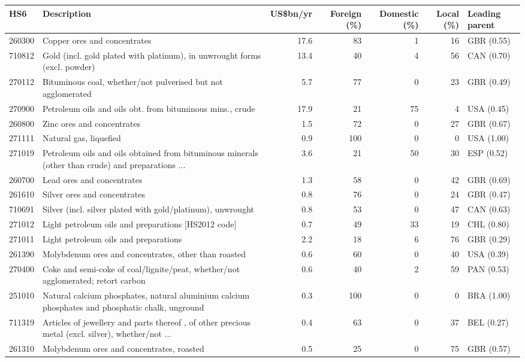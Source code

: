 \begin{tabular}{@{}l p{6.4cm} r r r r l@{}}
\toprule
HS6 & Description & US\$bn/yr & Foreign (\%) & Domestic (\%) & Local (\%) & Leading parent \\
\midrule
260300 & Copper ores and concentrates & 17.6 & 83 & 1 & 16 & GBR (0.55) \\
710812 & Gold (incl. gold plated with platinum), in unwrought forms (excl. powder) & 13.4 & 40 & 4 & 56 & CAN (0.70) \\
270112 & Bituminous coal, whether/\allowbreak{}not pulverised but not agglomerated & 5.7 & 77 & 0 & 23 & GBR (0.49) \\
270900 & Petroleum oils and oils obt. from bituminous mins., crude & 17.9 & 21 & 75 & 4 & USA (0.45) \\
260800 & Zinc ores and concentrates & 1.5 & 72 & 0 & 27 & GBR (0.67) \\
271111 & Natural gas, liquefied & 0.9 & 100 & 0 & 0 & USA (1.00) \\
271019 & Petroleum oils and oils obtained from bituminous minerals (other than crude) and preparations ... & 3.6 & 21 & 50 & 30 & ESP (0.52) \\
260700 & Lead ores and concentrates & 1.3 & 58 & 0 & 42 & GBR (0.69) \\
261610 & Silver ores and concentrates & 0.8 & 76 & 0 & 24 & GBR (0.47) \\
710691 & Silver (incl. silver plated with gold/\allowbreak{}platinum), unwrought & 0.8 & 53 & 0 & 47 & CAN (0.63) \\
271012 & Light petroleum oils and preparations [HS2012 code] & 0.7 & 49 & 33 & 19 & CHL (0.80) \\
271011 & Light petroleum oils and preparations & 2.2 & 18 & 6 & 76 & GBR (0.29) \\
261390 & Molybdenum ores and concentrates, other than roasted & 0.6 & 60 & 0 & 40 & USA (0.39) \\
270400 & Coke and semi-coke of coal/\allowbreak{}lignite/\allowbreak{}peat, whether/\allowbreak{}not agglomerated; retort carbon & 0.6 & 40 & 2 & 59 & PAN (0.53) \\
251010 & Natural calcium phosphates, natural aluminium calcium phosphates and phosphatic chalk, unground & 0.3 & 100 & 0 & 0 & BRA (1.00) \\
711319 & Articles of jewellery and parts thereof , of other precious metal (excl. silver), whether/\allowbreak{}not ... & 0.4 & 63 & 0 & 37 & BEL (0.27) \\
261310 & Molybdenum ores and concentrates, roasted & 0.5 & 25 & 0 & 75 & GBR (0.57) \\

\end{tabular}
